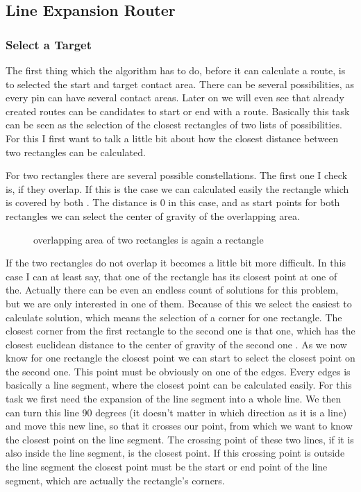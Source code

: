 \subsection{Line Expansion Router}

\subsubsection{Select a Target}
The first thing which the algorithm has to do, before it can calculate a route, is to selected the start and target contact area. There can be several possibilities, as every pin can have several contact areas. Later on we will even see that already created routes can be candidates to start or end with a route. Basically this task can be seen as the selection of the closest rectangles of two lists of possibilities. For this I first want to talk a little bit about how the closest distance between two rectangles can be calculated.

For two rectangles there are several possible constellations. The first one I check is, if they overlap. If this is the case we can calculated easily the rectangle which is covered by both . The distance is 0 in this case, and as start points for both rectangles we can select the center of gravity of the overlapping area.

\begin{figure}
	\centering
	
  	\caption{overlapping area of two rectangles is again a rectangle}
	\label{fig:rectangles_overlapping}
\end{figure}

If the two rectangles do not overlap it becomes a little bit more difficult. In this case I can at least say, that one of the rectangle has its closest point at one of the. Actually there can be even an endless count of solutions for this problem, but we are only interested in one of them. Because of this we select the easiest to calculate solution, which means the selection of a corner for one rectangle. The closest corner from the first rectangle to the second one is that one, which has the closest euclidean distance to the center of gravity of the second one . As we now know for one rectangle the closest point we can start to select the closest point on the second one. This point must be obviously on one of the edges. Every edges is basically a line segment, where the closest point can be calculated easily. For this task we first need the expansion of the line segment into a whole line. We then can turn this line 90 degrees (it doesn't matter in which direction as it is a line) and move this new line, so that it crosses our point, from which we want to know the closest point on the line segment. The crossing point of these two lines, if it is also inside the line segment, is the closest point. If this crossing point is outside the line segment the closest point must be the start or end point of the line segment, which are actually the rectangle's corners.

